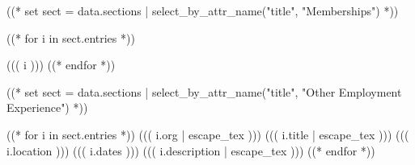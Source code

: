 \documentclass[10pt, letterpaper]{awesome-cv}
\begin{document}
((* set sect = data.sections | select_by_attr_name("title", "Memberships") *))
\begin{cventries}
\begin{cvitems}
  ((* for i in sect.entries *))
  \item{((( i )))}
  ((* endfor *))
\end{cvitems}
\vspace{1em}
\end{cventries}

((* set sect = data.sections | select_by_attr_name("title", "Other Employment Experience") *))
\begin{cventries}
((* for i in sect.entries *))
\cventry
  {((( i.org | escape_tex )))}
  {((( i.title | escape_tex )))}
  {((( i.location )))}
  {((( i.dates )))}
  {((( i.description | escape_tex )))}
((* endfor *))
\end{cventries}

\end{document}
